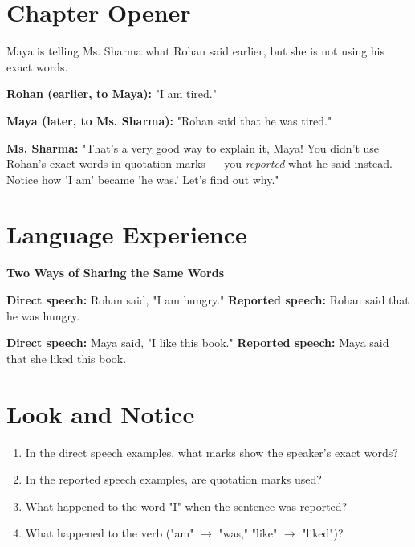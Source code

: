 \section{Chapter Opener}
Maya is telling Ms. Sharma what Rohan said earlier, but she is not using his exact words.

\textbf{Rohan (earlier, to Maya):} "I am tired."

\textbf{Maya (later, to Ms. Sharma):} "Rohan said that he was tired."

\textbf{Ms. Sharma:} "That's a very good way to explain it, Maya! You didn't use Rohan's exact words in quotation marks — you \textit{reported} what he said instead. Notice how 'I am' became 'he was.' Let's find out why."

\section{Language Experience}
\textbf{Two Ways of Sharing the Same Words}

\begin{tcolorbox}[colback=gray!5, colframe=gray!50, sharp corners, boxsep=0pt, left=5pt, right=5pt, top=5pt, bottom=5pt, breakable]
\textbf{Direct speech:} Rohan said, "I am hungry."
\textbf{Reported speech:} Rohan said that he was hungry.
\end{tcolorbox}

\begin{tcolorbox}[colback=gray!5, colframe=gray!50, sharp corners, boxsep=0pt, left=5pt, right=5pt, top=5pt, bottom=5pt, breakable]
\textbf{Direct speech:} Maya said, "I like this book."
\textbf{Reported speech:} Maya said that she liked this book.
\end{tcolorbox}

\section{Look and Notice}
\begin{thinkbox}
\begin{enumerate}
    \item In the direct speech examples, what marks show the speaker's exact words?
    \item In the reported speech examples, are quotation marks used?
    \item What happened to the word "I" when the sentence was reported?
    \item What happened to the verb ("am" $\rightarrow$ "was," "like" $\rightarrow$ "liked")?
\end{enumerate}
\end{thinkbox}

